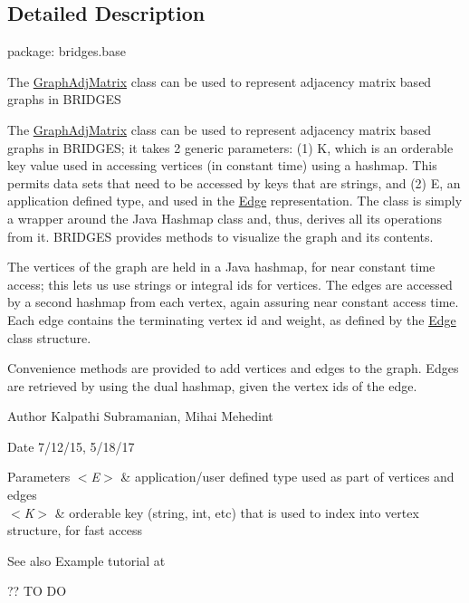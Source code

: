 \subsection{Detailed Description}
package\+: bridges.\+base 

The \mbox{\hyperlink{class_bridges_1_1_graph_adj_matrix_1_1_graph_adj_matrix}{Graph\+Adj\+Matrix}} class can be used to represent adjacency matrix based graphs in B\+R\+I\+D\+G\+ES

The \mbox{\hyperlink{class_bridges_1_1_graph_adj_matrix_1_1_graph_adj_matrix}{Graph\+Adj\+Matrix}} class can be used to represent adjacency matrix based graphs in B\+R\+I\+D\+G\+ES; it takes 2 generic parameters\+: (1) K, which is an orderable key value used in accessing vertices (in constant time) using a hashmap. This permits data sets that need to be accessed by keys that are strings, and (2) E, an application defined type, and used in the \mbox{\hyperlink{namespace_bridges_1_1_edge}{Edge}} representation. The class is simply a wrapper around the Java Hashmap class and, thus, derives all its operations from it. B\+R\+I\+D\+G\+ES provides methods to visualize the graph and its contents.

The vertices of the graph are held in a Java hashmap, for near constant time access; this lets us use strings or integral ids for vertices. The edges are accessed by a second hashmap from each vertex, again assuring near constant access time. Each edge contains the terminating vertex id and weight, as defined by the \mbox{\hyperlink{namespace_bridges_1_1_edge}{Edge}} class structure.

Convenience methods are provided to add vertices and edges to the graph. Edges are retrieved by using the dual hashmap, given the vertex ids of the edge.

\begin{DoxyAuthor}{Author}
Kalpathi Subramanian, Mihai Mehedint
\end{DoxyAuthor}
\begin{DoxyDate}{Date}
7/12/15, 5/18/17
\end{DoxyDate}

\begin{DoxyParams}{Parameters}
{\em $<$\+E$>$} & application/user defined type used as part of vertices and edges \\
\hline
{\em $<$\+K$>$} & orderable key (string, int, etc) that is used to index into vertex structure, for fast access\\
\hline
\end{DoxyParams}
\begin{DoxySeeAlso}{See also}
Example tutorial at 
\end{DoxySeeAlso}
?? TO DO 

